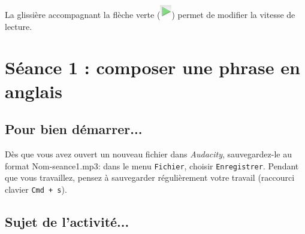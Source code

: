 \begin{itemize}


La glissière accompagnant la flèche verte (\includegraphics[angle=0,width=.4cm]{./images/son01/fleche_verte}) permet de modifier la vitesse de lecture.

\end{itemize}










%
%
%
%

\newpage

\section{Séance 1 : composer une phrase en anglais}\label{ficheSon5e1}

\subsection{Pour bien démarrer...}

Dès que vous avez ouvert un nouveau fichier dans \emph{Audacity}, sauvegardez-le au format Nom-seance1.mp3: dans le menu \texttt{Fichier}, choisir \texttt{Enregistrer}. Pendant que vous travaillez, pensez à sauvegarder régulièrement votre travail (raccourci clavier \texttt{Cmd + s}).   



\subsection{Sujet de l'activité...}

